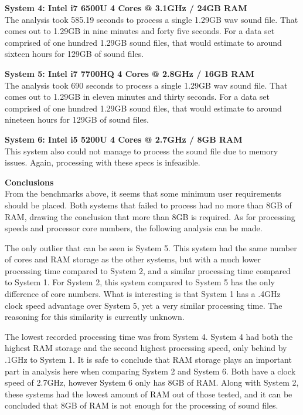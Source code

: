 \noindent\textbf{System 4: Intel i7 6500U 4 Cores @ 3.1GHz / 24GB RAM}\\
The analysis took 585.19 seconds to process a single 1.29GB wav sound file. That comes out to 1.29GB in nine minutes and forty five seconds. For a data set comprised of one hundred 1.29GB sound files, that would estimate to around sixteen hours for 129GB of sound files.

\noindent\textbf{System 5: Intel i7 7700HQ 4 Cores @ 2.8GHz / 16GB RAM}\\
The analysis took 690 seconds to process a single 1.29GB wav sound file. That comes out to 1.29GB in eleven minutes and thirty seconds. For a data set comprised of one hundred 1.29GB sound files, that would estimate to around nineteen hours for 129GB of sound files.

\noindent\textbf{System 6: Intel i5 5200U 4 Cores @ 2.7GHz / 8GB RAM}\\
This system also could not manage to process the sound file due to memory issues. Again, processing with these specs is infeasible.

\noindent\textbf{Conclusions}\\
From the benchmarks above, it seems that some minimum user requirements should be placed. Both systems that failed to process had no more than 8GB of RAM, drawing the conclusion that more than 8GB is required. As for processing speeds and processor core numbers, the following analysis can be made.\par
The only outlier that can be seen is System 5. This system had the same number of cores and RAM storage as the other systems, but with a much lower processing time compared to System 2, and a similar processing time compared to System 1. For System 2, this system compared to System 5 has the only difference of core numbers. What is interesting is that System 1 has a .4GHz clock speed advantage over System 5, yet a very similar processing time. The reasoning for this similarity is currently unknown.\par
The lowest recorded processing time was from System 4. System 4 had both the highest RAM storage and the second highest processing speed, only behind by .1GHz to System 1.
It is safe to conclude that RAM storage plays an important part in analysis here when comparing System 2 and System 6. Both have a clock speed of 2.7GHz, however System 6 only has 8GB of RAM. Along with System 2, these systems had the lowest amount of RAM out of those tested, and it can be concluded that 8GB of RAM is not enough for the processing of sound files.\par
